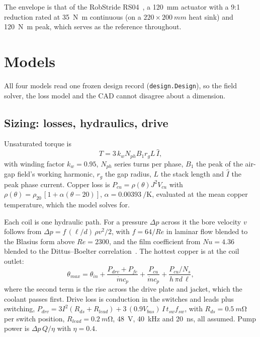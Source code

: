 \documentclass[11pt]{article}
\newcommand{\code}[1]{\texttt{\small #1}}
\newcommand{\Nm}{\si{N.m}}
\begin{document}
The envelope is that of the RobStride RS04~\cite{robstride-rs04}, a
\diameter\SI{120}{mm} actuator with a \num{9}:\num{1} reduction rated at
\SI{35}{\Nm} continuous (on a $220\times\SI{200}{mm}$ heat sink) and
\SI{120}{\Nm} peak, which serves as the reference
throughout.

\section{Models}
\label{sec:models}

All four models read one frozen design record (\code{design.Design}), so the
field solver, the loss model and the CAD cannot disagree about a dimension.

\subsection{Sizing: losses, hydraulics, drive}
\label{sec:sizing}

Unsaturated torque is
\begin{equation}
T = 3\,k_w N_{ph} B_1 r_g L \,\hat{I},
\label{eq:torque}
\end{equation}
with winding factor $k_w = 0.95$, $N_{ph}$ series turns per phase, $B_1$ the
peak of the air-gap field's working harmonic, $r_g$ the gap radius, $L$ the
stack length and $\hat I$ the peak phase current. Copper loss is
$P_{cu} = \rho(\theta) J^2 V_{cu}$ with
$\rho(\theta)=\rho_{20}\,[1+\alpha(\theta-20)]$, $\alpha=\SI{0.00393}{\per\kelvin}$,
evaluated at the mean copper temperature, which the model solves for.

Each coil is one hydraulic path. For a pressure $\Delta p$ across it the bore
velocity $v$ follows from $\Delta p = f\,(\ell/d)\,\rho v^2/2$, with $f=64/Re$
in laminar flow blended to the Blasius form above $Re=2300$, and the film
coefficient from $Nu=4.36$ blended to the Dittus--Boelter
correlation~\cite{bergman2011}. The
hottest copper is at the coil outlet:
\begin{equation}
\theta_{max} = \theta_{in} + \frac{P_{drv}+P_{fe}}{\dot m c_p}
  + \frac{P_{cu}}{\dot m c_p}
  + \frac{P_{cu}/N_s}{h\,\pi d\,\ell},
\label{eq:tmax}
\end{equation}
where the second term is the rise across the drive plate and jacket, which the
coolant passes first. Drive loss is conduction in the switches and leads plus
switching, $P_{drv}=3I^2(R_{ds}+R_{lead}) + 3\,(0.9V_{bus})\,I\,t_{sw}f_{sw}$,
with $R_{ds}=\SI{0.5}{m\ohm}$ per switch position, $R_{lead}=\SI{0.2}{m\ohm}$,
\SI{48}{V}, \SI{40}{kHz} and \SI{20}{ns}, all assumed. Pump power is
$\Delta p\,Q/\eta$ with $\eta=0.4$.
\end{document}
